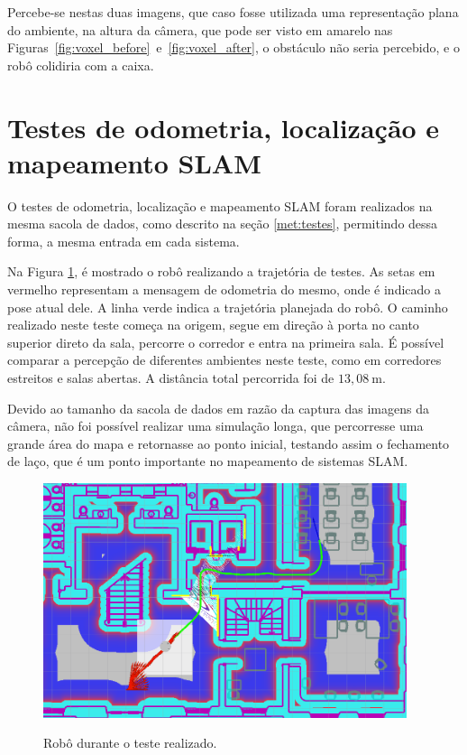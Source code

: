 \documentclass[repeatfields,xlists,xpacks,oneside,yearsonly]{ufrgscca}
\begin{document}
Percebe-se nestas duas imagens, que caso fosse utilizada uma
representação plana do ambiente, na altura da câmera, que pode ser
visto em amarelo nas
Figuras~\ref{fig:voxel_before}~e~\ref{fig:voxel_after}, o obstáculo
não seria percebido, e o robô colidiria com a caixa.

\section{Testes de odometria, localização e mapeamento SLAM}

O testes de odometria, localização e mapeamento SLAM foram realizados
na mesma sacola de dados, como descrito na seção \ref{met:testes},
permitindo dessa forma, a mesma entrada em cada sistema.

Na Figura \ref{fig:base_bag}, é mostrado o robô realizando a
trajetória de testes. As setas em vermelho representam a mensagem de
odometria do mesmo, onde é indicado a pose atual dele. A linha verde
indica a trajetória planejada do robô. O caminho realizado neste
teste começa na origem, segue em direção à porta no canto superior
direto da sala, percorre o corredor e entra na primeira sala. É
possível comparar a percepção de diferentes ambientes neste teste,
como em corredores estreitos e salas abertas. A distância total
percorrida foi de $13,08~\si{\meter}$.

Devido ao tamanho da sacola de dados em razão da captura das imagens
da câmera, não foi possível realizar uma simulação longa, que
percorresse uma grande área do mapa e retornasse ao ponto inicial,
testando assim o fechamento de laço, que é um ponto importante no
mapeamento de sistemas SLAM.

\begin{figure}[h]
    {
        \centering
        \caption{Robô durante o teste realizado.}
        \label{fig:base_bag}
        \includegraphics[width=0.95\textwidth]{base_bag_sim_zoom.png}\\
    }
\end{figure}
\end{document}
